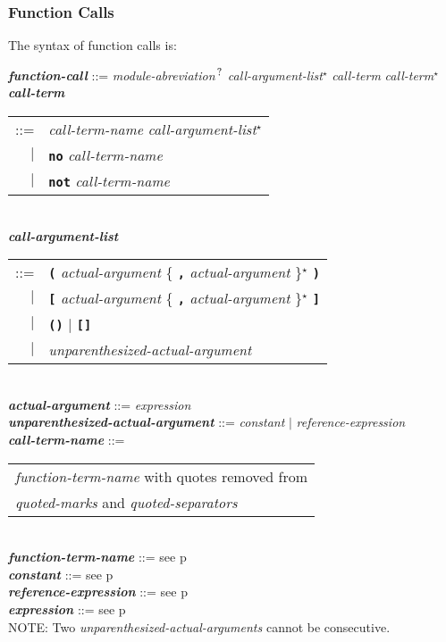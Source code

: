 \documentclass[12pt]{article}
\newcommand{\TT}[1]{{\tt \bfseries #1}}
\newcommand{\STAR}{{\Large $^\star$}}
\newcommand{\QMARK}{{$^{\,\mbox{\footnotesize ?}}$}}
\newcommand{\ttkey}[1]{{\tt \bfseries #1}}
\newcommand{\emkey}[1]{{\em \bfseries #1}}
\newcommand{\pagref}[1]{p\pageref{#1}}
\newenvironment{indpar}[1][0.3in]%
	{\begin{list}{}%
		     {\setlength{\itemsep}{0in}%
		      \setlength{\topsep}{0in}%
		      \setlength{\parsep}{1ex}%
		      \setlength{\labelwidth}{#1}%
		      \setlength{\leftmargin}{#1}%
		      \addtolength{\leftmargin}{\labelsep}}%
	 \item}%
	{\end{list}}
\begin{document}
\subsubsection{Function Calls}
\label{FUNCTION-CALLS}

The syntax of function calls is:

\begin{indpar}
\emkey{function-call} ::= {\em module-abreviation}\QMARK{}
    	                  {\em call-argument-list}\STAR{}
                          {\em call-term} {\em call-term}\STAR{}
\\[0.5ex]
\emkey{call-term}
    \begin{tabular}[t]{rl}
    ::= & {\em call-term-name} {\em call-argument-list}\STAR{} \\
    $|$ & \ttkey{no} {\em call-term-name} \\
    $|$ & \ttkey{not} {\em call-term-name} \\
    \end{tabular}
\\[0.5ex]
\emkey{call-argument-list}
    \begin{tabular}[t]{rl}
    ::= & \TT{(} {\em actual-argument}
          \{ \TT{,} {\em actual-argument} \}\STAR{} \TT{)} \\
    $|$ & \TT{[} {\em actual-argument}
          \{ \TT{,} {\em actual-argument} \}\STAR{} \TT{]} \\
    $|$ & \TT{()} $|$ \TT{[]} \\
    $|$ & {\em unparenthesized-actual-argument} \\
    \end{tabular}
\\[0.5ex]
\emkey{actual-argument} ::= {\em expression}
\\[0.5ex]
\emkey{unparenthesized-actual-argument} ::=
    {\em constant} $|$ {\em reference-expression}
\\[0.5ex]
\emkey{call-term-name}\label{CALL-TERM-NAME} ::=
    \begin{tabular}[t]{@{}l}
    {\em function-term-name} with quotes removed from \\
    {\em quoted-marks} and {\em quoted-separators}
    \end{tabular}
\\[0.5ex]
\emkey{function-term-name} ::= see \pagref{FUNCTION-TERM-NAME}
\\[0.5ex]
\emkey{constant} ::= see \pagref{CONSTANTS}
\\[0.5ex]
\emkey{reference-expression} ::= see \pagref{REFERENCE-EXPRESSIONS}
\\[0.5ex]
\emkey{expression} ::= see \pagref{EXPRESSION}
\\[2.0ex]
NOTE: Two {\em unparenthesized-actual-arguments} cannot be consecutive.
\end{indpar}
\end{document}

